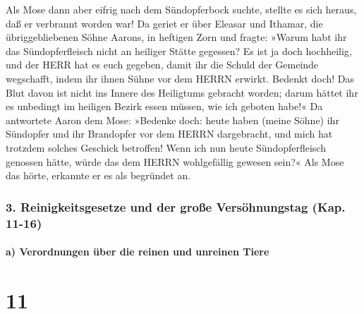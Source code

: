 Als Mose dann aber eifrig nach dem Sündopferbock suchte,
stellte es sich heraus, daß er verbrannt worden war! Da geriet er über
Eleasar und Ithamar, die übriggebliebenen Söhne Aarons, in heftigen Zorn
und fragte: »Warum habt ihr das Sündopferfleisch nicht an
heiliger Stätte gegessen? Es ist ja doch hochheilig, und der HERR hat es
euch gegeben, damit ihr die Schuld der Gemeinde wegschafft, indem ihr
ihnen Sühne vor dem HERRN erwirkt. Bedenkt doch! Das Blut
davon ist nicht ins Innere des Heiligtums gebracht worden; darum hättet
ihr es unbedingt im heiligen Bezirk essen müssen, wie ich geboten habe!«
Da antwortete Aaron dem Mose: »Bedenke doch: heute haben
(meine Söhne) ihr Sündopfer und ihr Brandopfer vor dem HERRN
dargebracht, und mich hat trotzdem solches Geschick betroffen! Wenn ich
nun heute Sündopferfleisch genossen hätte, würde das dem HERRN
wohlgefällig gewesen sein?« Als Mose das hörte, erkannte
er es als begründet an.

\hypertarget{reinigkeitsgesetze-und-der-grouxdfe-versuxf6hnungstag-kap.-11-16}{%
\subsubsection{3. Reinigkeitsgesetze und der große Versöhnungstag (Kap.
11-16)}\label{reinigkeitsgesetze-und-der-grouxdfe-versuxf6hnungstag-kap.-11-16}}

\hypertarget{a-verordnungen-uxfcber-die-reinen-und-unreinen-tiere}{%
\paragraph{a) Verordnungen über die reinen und unreinen
Tiere}\label{a-verordnungen-uxfcber-die-reinen-und-unreinen-tiere}}

\hypertarget{section-10}{%
\section{11}\label{section-10}}

